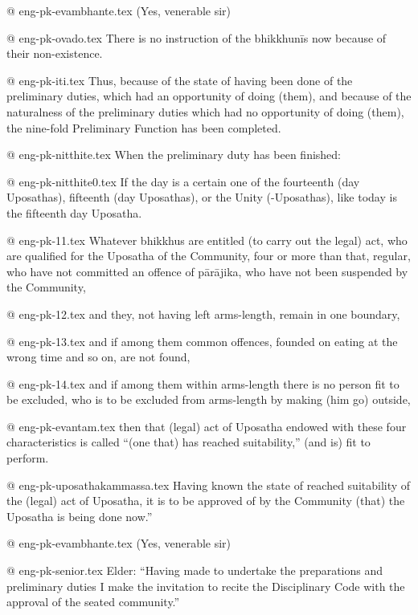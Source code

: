 @ eng-pk-evambhante.tex
(Yes, venerable sir)

@ eng-pk-ovado.tex
There is no instruction of the bhikkhunīs now because of their non-existence. 

@ eng-pk-iti.tex
Thus, because of the state of having been done of the preliminary duties, which had an opportunity of doing (them), and because of the naturalness of the preliminary duties which had no opportunity of doing (them), the nine-fold Preliminary Function has been completed.

@ eng-pk-nitthite.tex
When the preliminary duty has been finished:

@ eng-pk-nitthite0.tex
If the day is a certain one of the fourteenth (day Uposathas), fifteenth (day Uposathas), or the Unity (-Uposathas), like today is the fifteenth day Uposatha.

@ eng-pk-11.tex
Whatever bhikkhus are entitled (to carry out the legal) act, who are qualified for the Uposatha of the Community, four or more than that, regular, who have not committed an offence of pārājika, who have not been suspended by the Community,

@ eng-pk-12.tex
and they, not having left arms-length, remain in one boundary,

@ eng-pk-13.tex
and if among them common offences, founded on eating at the wrong time and so on, are not found,

@ eng-pk-14.tex
and if among them within arms-length there is no person fit to be excluded, who is to be excluded from arms-length by making (him go) outside,

@ eng-pk-evantam.tex
then that (legal) act of Uposatha endowed with these four characteristics is called “(one that) has reached suitability,” (and is) fit to perform.

@ eng-pk-uposathakammassa.tex
Having known the state of reached suitability of the (legal) act of Uposatha, it is to be approved of by the Community (that) the Uposatha is being done now.”

@ eng-pk-evambhante.tex
(Yes, venerable sir)

@ eng-pk-senior.tex
Elder: “Having made to undertake the preparations and preliminary duties I make the invitation to recite the Disciplinary Code with the approval of the seated community.”
